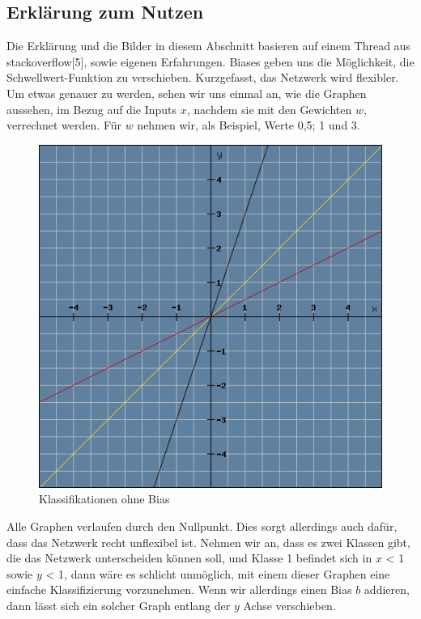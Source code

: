 \documentclass[12pt]{article}
\begin{document}
\subsection{Erklärung zum Nutzen} Die Erklärung und die Bilder in diesem Abschnitt basieren auf einem Thread aus stackoverflow[5], sowie eigenen Erfahrungen. Biases geben uns die Möglichkeit, die Schwellwert-Funktion zu verschieben. Kurzgefasst, das Netzwerk wird flexibler. 
Um etwas genauer zu werden, sehen wir uns einmal an, wie die Graphen aussehen, im Bezug auf die Inputs $x$, nachdem sie mit den Gewichten $w$, verrechnet werden. Für $w$ nehmen wir, als Beispiel, Werte 0,5; 1 und 3.
\begin{figure}[H]
\centering
\includegraphics[scale=0.60]{./Images/Pasted image 20231005144238.png}
\caption{Klassifikationen ohne Bias}
\label{Klassifikationen ohne Bias}
\end{figure}
Alle Graphen verlaufen durch den Nullpunkt. Dies sorgt allerdings auch dafür, dass das Netzwerk recht unflexibel ist. Nehmen wir an, dass es zwei Klassen gibt, die das Netzwerk unterscheiden können soll, und Klasse 1 befindet sich in $x$ < 1 sowie $y$ < 1, dann wäre es schlicht unmöglich, mit einem dieser Graphen eine einfache Klassifizierung vorzunehmen. Wenn wir allerdings einen Bias $b$ addieren, dann lässt sich ein solcher Graph entlang der $y$ Achse verschieben.
\end{document}
